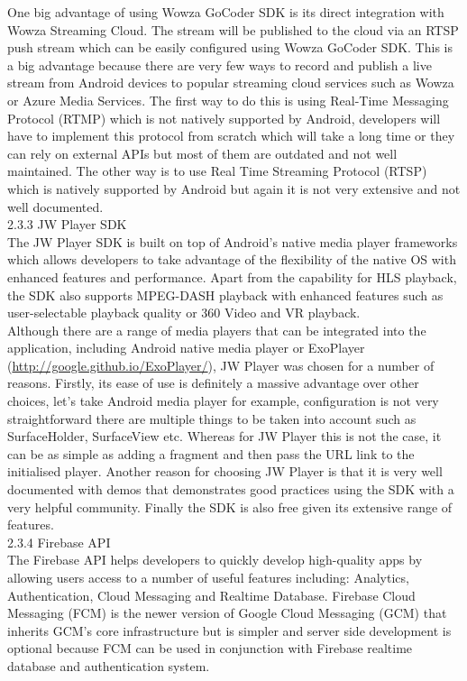 \documentclass{article}
\begin{document}
\begin{flushleft}
One big advantage of using Wowza GoCoder SDK is its direct integration with Wowza Streaming Cloud. The stream will be published to the cloud via an RTSP push stream which can be easily configured using Wowza GoCoder SDK. This is a big advantage because there are very few ways to record and publish a live stream from Android devices to popular streaming cloud services such as Wowza or Azure Media Services. The first way to do this is using Real-Time Messaging Protocol (RTMP) which is not natively supported by Android, developers will have to implement this protocol from scratch which will take a long time or they can rely on external APIs but most of them are outdated and not well maintained. The other way is to use Real Time Streaming Protocol (RTSP) which is natively supported by Android but again it is not very extensive and not well documented.\\
{\large 2.3.3 JW Player SDK}\\
The JW Player SDK is built on top of Android's native media player frameworks which allows developers to take advantage of the flexibility of the native OS with enhanced features and performance. Apart from the capability for HLS playback, the SDK also supports MPEG-DASH playback with enhanced features such as user-selectable playback quality or 360 Video and VR playback.\\
Although there are a range of media players that can be integrated into the application, including Android native media player or ExoPlayer (\url {http://google.github.io/ExoPlayer/}), JW Player was chosen for a number of reasons. Firstly, its ease of use is definitely a massive advantage over other choices, let's take Android media player for example, configuration is not very straightforward there are multiple things to be taken into account such as SurfaceHolder, SurfaceView etc. Whereas for JW Player this is not the case, it can be as simple as adding a fragment and then pass the URL link to the initialised player. Another reason for choosing JW Player is that it is very well documented with demos that demonstrates good practices using the SDK with a very helpful community. Finally the SDK is also free given its extensive range of features.\\
{\large 2.3.4 Firebase API}\\
The Firebase API helps developers to quickly develop high-quality apps by allowing users access to a number of useful features including: Analytics, Authentication, Cloud Messaging and Realtime Database. Firebase Cloud Messaging (FCM) is the newer version of Google Cloud Messaging (GCM) that inherits GCM's core infrastructure but is simpler and server side development is optional because FCM can be used in conjunction with Firebase realtime database and authentication system.\\

\end{flushleft}
\end{document}
